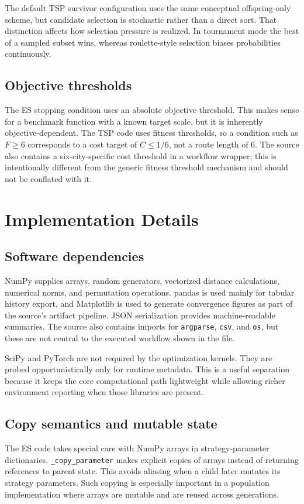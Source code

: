 \documentclass[11pt,a4paper]{article}
\newcommand{\code}[1]{\texttt{#1}}
\begin{document}
The default TSP survivor configuration uses the same conceptual offspring-only scheme, but candidate selection is stochastic rather than a direct sort. That distinction affects how selection pressure is realized. In tournament mode the best of a sampled subset wins, whereas roulette-style selection biases probabilities continuously.

\subsection{Objective thresholds}
The ES stopping condition uses an absolute objective threshold. This makes sense for a benchmark function with a known target scale, but it is inherently objective-dependent. The TSP code uses fitness thresholds, so a condition such as $F\geq 6$ corresponds to a cost target of $C\leq 1/6$, not a route length of 6. The source also contains a six-city-specific cost threshold in a workflow wrapper; this is intentionally different from the generic fitness threshold mechanism and should not be conflated with it.

\section{Implementation Details}
\subsection{Software dependencies}
NumPy supplies arrays, random generators, vectorized distance calculations, numerical norms, and permutation operations. pandas is used mainly for tabular history export, and Matplotlib is used to generate convergence figures as part of the source's artifact pipeline. JSON serialization provides machine-readable summaries. The source also contains imports for \code{argparse}, \code{csv}, and \code{os}, but these are not central to the executed workflow shown in the file.

SciPy and PyTorch are not required by the optimization kernels. They are probed opportunistically only for runtime metadata. This is a useful separation because it keeps the core computational path lightweight while allowing richer environment reporting when those libraries are present.

\subsection{Copy semantics and mutable state}
The ES code takes special care with NumPy arrays in strategy-parameter dictionaries. \code{\_copy\_parameter} makes explicit copies of arrays instead of returning references to parent state. This avoids aliasing when a child later mutates its strategy parameters. Such copying is especially important in a population implementation where arrays are mutable and are reused across generations.
\end{document}
